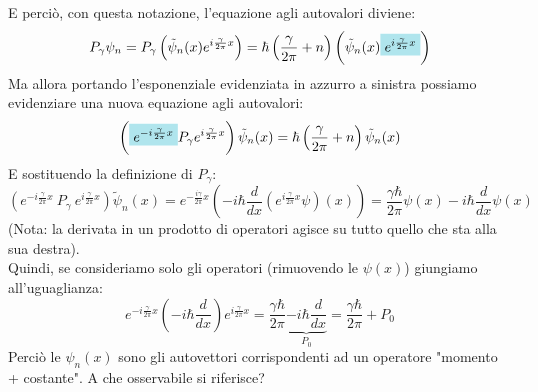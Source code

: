 \documentclass[../../FisicaTeorica.tex]{subfiles}
\begin{document}
E perciò, con questa notazione, l'equazione agli autovalori diviene:
\[
P_\gamma \psi_n = P_\gamma\left(\tilde{\psi}_n(x) e^{i\frac{\gamma}{2\pi}x}\right) = \hbar \left(\frac{\gamma}{2\pi}+n\right)\left(\tilde{\psi}_n(x) \hlc{SkyBlue}{e^{i\frac{\gamma}{2\pi}x}}\right )
\]
Ma allora portando l'esponenziale evidenziata in azzurro a sinistra possiamo evidenziare una nuova equazione agli autovalori:
\[
\left( \hlc{SkyBlue}{e^{-i\frac{\gamma}{2\pi}x}}P_\gamma e^{i\frac{\gamma}{2\pi}x}\right )\tilde{\psi}_n(x) = \hbar \left(\frac{\gamma}{2\pi}+n\right)\tilde{\psi}_n(x)
\]
E sostituendo la definizione di $P_\gamma$:
\[
\left(e^{-i\frac{\gamma}{2\pi}x}\ P_\gamma\ e^{i\frac{\gamma}{2\pi}x}\right){\widetilde{\psi}}_n\left(x\right)=
e^{-\frac{i\gamma}{2\pi}x}\left(-i\hbar\frac{d}{dx}\left(e^{i\frac{\gamma}{2\pi}x}\psi\right)\left(x\right)\right)=\frac{\gamma\hbar}{2\pi}\psi
\left(x\right)-i\hbar \frac{d}{dx}\psi(x)
\]
(Nota: la derivata in un prodotto di operatori agisce su tutto quello che sta alla sua destra).\\
Quindi, se consideriamo solo gli operatori (rimuovendo le $\psi(x)$) giungiamo all'uguaglianza:
\[
e^{-i\frac{\gamma}{2\pi}x}\left(-i\hbar\frac{d}{dx}\right)e^{i\frac{\gamma}{2\pi}x}=\frac{\gamma\hbar}{2\pi}\underbrace{-i\hbar \frac{d}{dx}}_{P_0} = \frac{\gamma \hbar}{2\pi} + P_0
\]
Perciò le $\psi_n(x)$ sono gli autovettori corrispondenti ad un operatore "momento + costante". A che osservabile si riferisce?\\
\end{document}
